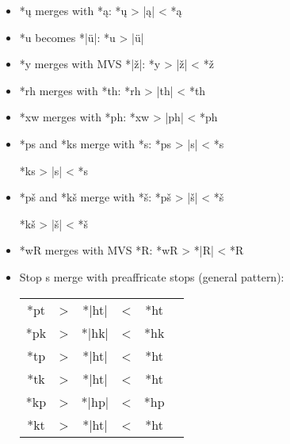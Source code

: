 \documentclass[output=paper]{LSP/langsci}
\begin{document}
\begin{itemize}
\item *\k{u} merges with *\k{a}: \hspace{3.1em} *\k{u}	>	|\k{a}|	<	*\k{a}
\item *u becomes *|\"u|:	 \hspace{4.1em} *u	>	|\"u|
\item *y merges with MVS *|\v{z}|: \hspace{1em} *y	>	|\v{z}|	<	*\v{z}
\item *rh merges with *th: \hspace{3em} *rh	>	|th|	<	*th
\item *xw merges with *ph:	\hspace{ 3em} *xw	>	|ph|	<	*ph
\item *ps and *ks merge with *s: \hspace{1em} *ps	>	|s|	<	*s

\hspace{12em} *ks	>	|s|	<	*s
\item *pš and *kš merge with *š: \hspace{1em} *pš	>	|š|	<	*š

\hspace{12em} *kš	>	|š|	<	*š
\item *wR merges with MVS *R: \hspace{1em} *wR	>	*|R|	<	*R
\item Stop s merge with preaffricate stops (general pattern):	


\begin{tabular}[t]{c c c c c c }
*pt & > & *|ht| & < & *ht \\
*pk	& > & *|hk| & < & *hk \\
*tp & > & *|ht| & < & *ht \\
*tk & > & *|ht| & < & *ht \\
*kp	& >	 & *|hp|	& <	& *hp \\
*kt	& >	& *|ht| & < & *ht \\
\end{tabular}
\end{itemize} 
 
\end{document}
